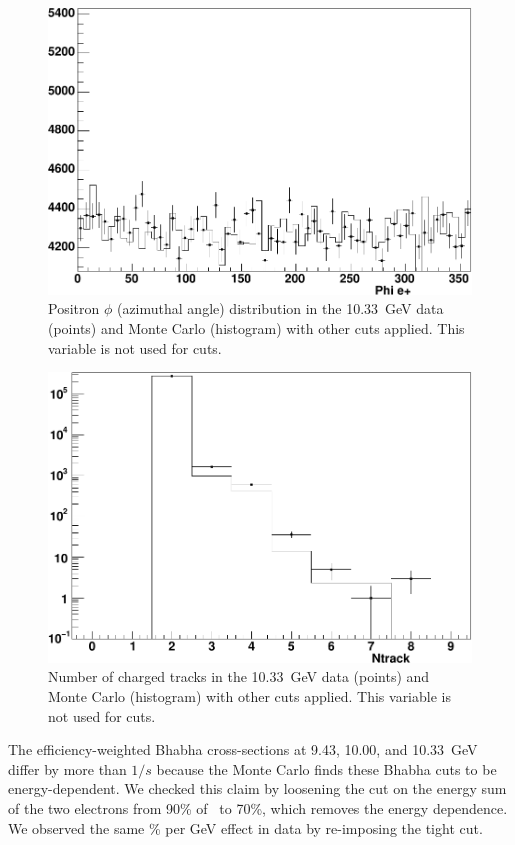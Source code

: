 \documentclass{cornell}
\begin{document}
\begin{figure}[p]
  \begin{center}
    \includegraphics[width=0.7\linewidth]{plots/eeagreemente}
  \end{center}
  \caption{\label{eeagreementg} Positron $\phi$ (azimuthal angle)
  distribution in the 10.33~GeV data (points) and Monte Carlo
  (histogram) with other cuts applied.  This variable is not used for
  cuts.}
\end{figure}

\begin{figure}[p]
  \begin{center}
    \includegraphics[width=0.7\linewidth]{plots/eeagreementh}
  \end{center}
  \caption{\label{eeagreementh} Number of charged tracks in the
  10.33~GeV data (points) and Monte Carlo (histogram) with other cuts
  applied.  This variable is not used for cuts.}
\end{figure}

The efficiency-weighted Bhabha cross-sections at 9.43, 10.00, and 10.33~GeV
differ by more than $1/s$ because the Monte Carlo finds these Bhabha
cuts to be energy-dependent.  We checked this claim by loosening the
cut on the energy sum of the two electrons from 90\% of \ecm\ to 70\%,
which removes the energy dependence.  We observed the same \bork\% per
GeV effect in data by re-imposing the tight cut.
\end{document}

